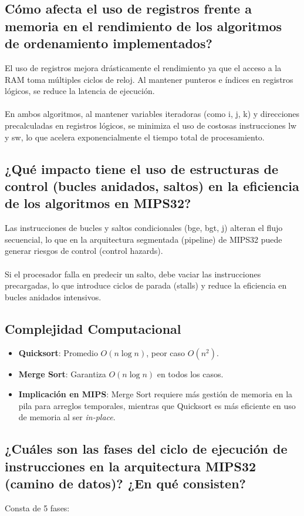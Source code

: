 \documentclass[12pt]{article}
\begin{document}
\subsection{Cómo afecta el uso de registros frente a memoria en el rendimiento de los algoritmos 
de ordenamiento implementados?}
El uso de registros mejora drásticamente el rendimiento ya que el acceso a la RAM toma múltiples ciclos de reloj. Al mantener punteros e índices en registros lógicos, se reduce la latencia de ejecución.
\\
\\
En ambos algoritmos, al mantener variables iteradoras (como i, j, k) y direcciones precalculadas en registros lógicos, se minimiza el uso de costosas instrucciones lw y sw, lo que acelera exponencialmente el tiempo total de procesamiento.

\subsection{¿Qué impacto tiene el uso de estructuras de control (bucles anidados, saltos) en la 
eficiencia de los algoritmos en MIPS32?}
Las instrucciones de bucles y saltos condicionales (bge, bgt, j) alteran el flujo secuencial, lo que en la arquitectura segmentada (pipeline) de MIPS32 puede generar riesgos de control (control hazards).
\\
\\
Si el procesador falla en predecir un salto, debe vaciar las instrucciones precargadas, lo que introduce ciclos de parada (stalls) y reduce la eficiencia en bucles anidados intensivos.

\subsection{ Complejidad Computacional}
\begin{itemize}
    \item \textbf{Quicksort}: Promedio $O(n \log n)$, peor caso $O(n^2)$.
    \item \textbf{Merge Sort}: Garantiza $O(n \log n)$ en todos los casos.
    \item \textbf{Implicación en MIPS}: Merge Sort requiere más gestión de memoria en la pila para arreglos temporales, mientras que Quicksort es más eficiente en uso de memoria al ser \textit{in-place}.
\end{itemize}

\subsection{ ¿Cuáles son las fases del ciclo de ejecución de instrucciones en la arquitectura MIPS32 
(camino de datos)? ¿En qué consisten? }
Consta de 5 fases:
\end{document}
